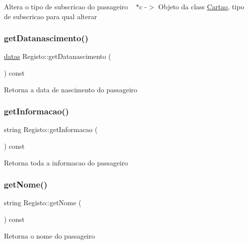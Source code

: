 Altera o tipo de subscricao do passageiro ~\newline
$\ast$c -\/$>$ Objeto da class \mbox{\hyperlink{class_cartao}{Cartao}}, tipo de subscricao para qual alterar \mbox{\label{class_registo_ac1fca826ae5de2a5a1c32694ea196657}} 
\subsubsection{\texorpdfstring{get\+Datanascimento()}{getDatanascimento()}}
{\footnotesize\ttfamily \mbox{\hyperlink{structdatas}{datas}} Registo\+::get\+Datanascimento (\begin{DoxyParamCaption}{ }\end{DoxyParamCaption}) const}

Retorna a data de nascimento do passageiro \mbox{\label{class_registo_ab060c606736697ff17be7504019adf3f}} 
\subsubsection{\texorpdfstring{get\+Informacao()}{getInformacao()}}
{\footnotesize\ttfamily string Registo\+::get\+Informacao (\begin{DoxyParamCaption}{ }\end{DoxyParamCaption}) const}

Retorna toda a informacao do passageiro \mbox{\label{class_registo_a7302a5c59866e8e008b1bb1e47511b94}} 
\subsubsection{\texorpdfstring{get\+Nome()}{getNome()}}
{\footnotesize\ttfamily string Registo\+::get\+Nome (\begin{DoxyParamCaption}{ }\end{DoxyParamCaption}) const}

Retorna o nome do passageiro \mbox{\label{class_registo_a218c39c55b2e8f6d546dd3ff45687f6f}} 
